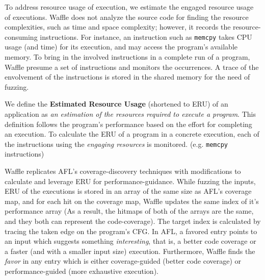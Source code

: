 
To address resource usage of execution, we estimate the engaged resource usage of executions. Waffle does not analyze the source code for finding the resource complexities, such as time and space complexity; however, it records the resource-consuming instructions. For instance, an instruction such as \texttt{memcpy} takes CPU usage (and time) for its execution, and may access the program's available memory. To bring in the involved instructions in a complete run of a program, Waffle presume a set of instructions and monitors the occurrences. A trace of the envolvement of the instructions is stored in the shared memory for the need of fuzzing.


We define the \textbf{Estimated Resource Usage} (shortened to ERU) of an application as \textit{an estimation of the resources required to execute a program}. This definition follows the program's performance based on the effort for completing an execution. To calculate the ERU of a program in a concrete execution, each of the instructions using the \textit{engaging resources} is monitored. (e.g. \texttt{memcpy} instructions)  


Waffle replicates AFL's coverage-discovery techniques with modifications to calculate and leverage ERU for performance-guidance. While fuzzing the inputs, ERU of the executions is stored in an array of the same size as AFL's coverage map, and for each hit on the coverage map, Waffle updates the same index of it's performance array (As a result, the hitmaps of both of the arrays are the same, and they both can represent the code-coverage). The target index is calculated by tracing the taken edge on the program's CFG. In AFL, a favored entry points to an input which suggests something \textit{interesting}, that is, a better code coverage or a faster (and with a smaller input size) execution. Furthermore, Waffle finds the \textit{favor} in any entry which is either coverage-guided (better code coverage) or performance-guided (more exhaustive execution).

